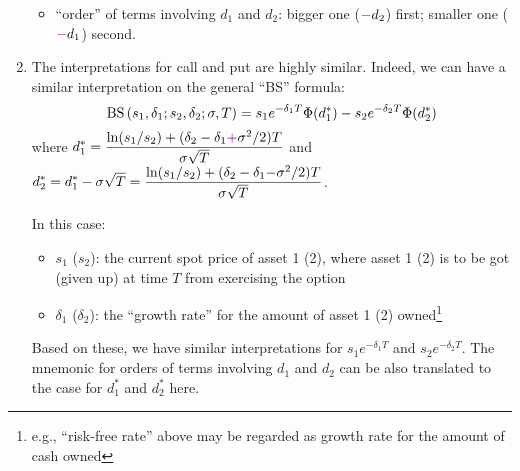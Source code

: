 \begin{enumerate}
\begin{itemize}
\item ``order'' of terms involving \(d_1\) and \(d_2\): bigger one (\({\color{Maroon}-}d_2\))
first; smaller one (\({\color{Maroon}-}d_1\)) second.
\end{itemize}

\item The interpretations for call and put are highly similar. Indeed, we can have
a similar interpretation on the general ``BS'' formula:
\[
\operatorname{BS}\qty(s_1,\delta_1;s_2,\delta_2;\sigma,T)=s_1e^{-\delta_1 T}\Phi(d_1^*)-s_2e^{-\delta_2 T}\Phi(d_2^*)
\]
where \(\displaystyle d_1^*=\frac{\ln(s_1/s_2)+(\delta_2-\delta_1{\color{violet}+}\sigma^2/2)T}{\sigma\sqrt{T}}\)
and \(\displaystyle d_2^{*}=d_1^{*}-\sigma\sqrt{T}=\frac{\ln(s_1/s_2)+(\delta_2-\delta_1{\color{violet}-}\sigma^2/2)T}{\sigma\sqrt{T}}\).

In this case:
\begin{itemize}
\item \(s_1\) (\(s_2\)): the current spot price of asset 1 (2), where asset 1
(2) is to be got (given up) at time \(T\) from exercising the option
\item \(\delta_1\) (\(\delta_2\)): the ``growth rate'' for the amount of
asset 1 (2) owned\footnote{e.g., ``risk-free rate'' above may be regarded as
growth rate for the amount of cash owned}
\end{itemize}
Based on these, we have similar interpretations for \(s_1e^{-\delta_1T}\) and
\(s_2e^{-\delta_2T}\). The mnemonic for orders of terms involving \(d_1\) and
\(d_2\) can be also translated to the case for \(d_1^*\) and \(d_2^*\) here.
\end{enumerate}
